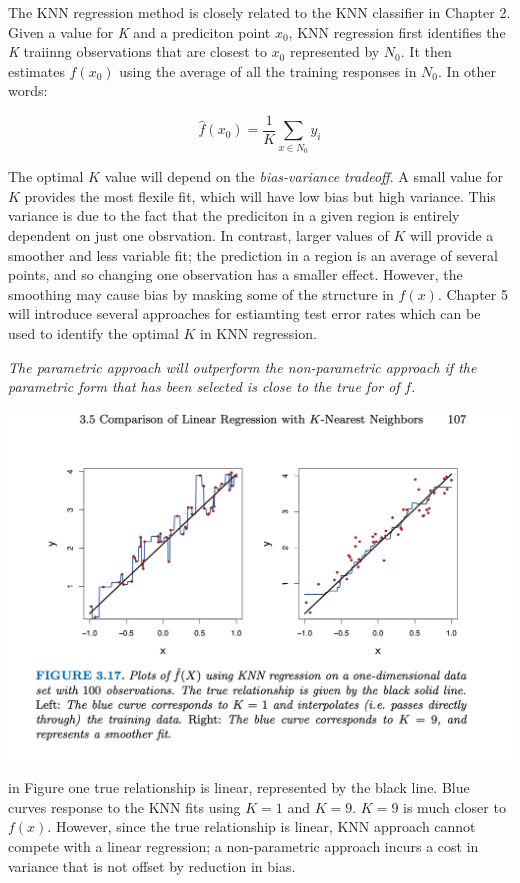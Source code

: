 \documentclass[
  letterpaper,
  DIV=11,
  numbers=noendperiod]{scrreprt}
\begin{document}
The KNN regression method is closely related to the KNN classifier in
Chapter 2. Given a value for \emph{K} and a prediciton point \(x_0\),
KNN regression first identifies the \emph{K} traiinng observations that
are closest to \(x_0\) represented by \(N_0\). It then estimates
\(f(x_0)\) using the average of all the training responses in \(N_0\).
In other words:

\[
\hat{f}(x_0) = \frac{1}{K}\sum_{x \in N_0} y_i
\]

The optimal \(K\) value will depend on the \emph{bias-variance
tradeoff}. A small value for \(K\) provides the most flexile fit, which
will have low bias but high variance. This variance is due to the fact
that the prediciton in a given region is entirely dependent on just one
obsrvation. In contrast, larger values of \(K\) will provide a smoother
and less variable fit; the prediction in a region is an average of
several points, and so changing one observation has a smaller effect.
However, the smoothing may cause bias by masking some of the structure
in \(f(x)\). Chapter 5 will introduce several approaches for estiamting
test error rates which can be used to identify the optimal \(K\) in KNN
regression.

\emph{The parametric approach will outperform the non-parametric
approach if the parametric form that has been selected is close to the
true for of} \(f\).

\includegraphics{fig3.17.png}

in Figure one true relationship is linear, represented by the black
line. Blue curves response to the KNN fits using \(K=1\) and \(K=9\).
\(K=9\) is much closer to \(f(x)\). However, since the true relationship
is linear, KNN approach cannot compete with a linear regression; a
non-parametric approach incurs a cost in variance that is not offset by
reduction in bias.
\end{document}

